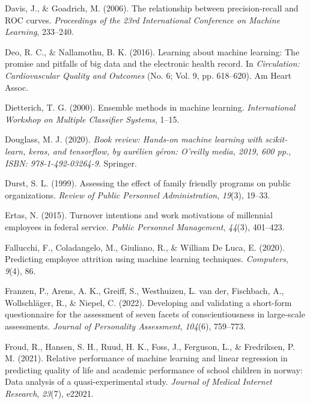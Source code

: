 \documentclass[
  man]{apa7}
\newlength{\cslhangindent}
\newlength{\cslentryspacingunit} %
\newenvironment{CSLReferences}[2] %
 {%
  \setlength{\parindent}{0pt}
  \ifodd #1
  \let\oldpar\par
  \def\par{\hangindent=\cslhangindent\oldpar}
  \fi
  \setlength{\parskip}{#2\cslentryspacingunit}
 }%
 {}
\begin{document}
\begin{CSLReferences}{1}{0}
\leavevmode{}%
Davis, J., \& Goadrich, M. (2006). The relationship between precision-recall and ROC curves. \emph{Proceedings of the 23rd International Conference on Machine Learning}, 233--240.

\leavevmode{}%
Deo, R. C., \& Nallamothu, B. K. (2016). Learning about machine learning: The promise and pitfalls of big data and the electronic health record. In \emph{Circulation: Cardiovascular Quality and Outcomes} (No. 6; Vol. 9, pp. 618--620). Am Heart Assoc.

\leavevmode{}%
Dietterich, T. G. (2000). Ensemble methods in machine learning. \emph{International Workshop on Multiple Classifier Systems}, 1--15.

\leavevmode{}%
Douglass, M. J. (2020). \emph{Book review: Hands-on machine learning with scikit-learn, keras, and tensorflow, by aur{é}lien g{é}ron: O'reilly media, 2019, 600 pp., ISBN: 978-1-492-03264-9}. Springer.

\leavevmode{}%
Durst, S. L. (1999). Assessing the effect of family friendly programs on public organizations. \emph{Review of Public Personnel Administration}, \emph{19}(3), 19--33.

\leavevmode{}%
Ertas, N. (2015). Turnover intentions and work motivations of millennial employees in federal service. \emph{Public Personnel Management}, \emph{44}(3), 401--423.

\leavevmode{}%
Fallucchi, F., Coladangelo, M., Giuliano, R., \& William De Luca, E. (2020). Predicting employee attrition using machine learning techniques. \emph{Computers}, \emph{9}(4), 86.

\leavevmode{}%
Franzen, P., Arens, A. K., Greiff, S., Westhuizen, L. van der, Fischbach, A., Wollschläger, R., \& Niepel, C. (2022). Developing and validating a short-form questionnaire for the assessment of seven facets of conscientiousness in large-scale assessments. \emph{Journal of Personality Assessment}, \emph{104}(6), 759--773.

\leavevmode{}%
Froud, R., Hansen, S. H., Ruud, H. K., Foss, J., Ferguson, L., \& Fredriksen, P. M. (2021). Relative performance of machine learning and linear regression in predicting quality of life and academic performance of school children in norway: Data analysis of a quasi-experimental study. \emph{Journal of Medical Internet Research}, \emph{23}(7), e22021.


\end{CSLReferences}
\end{document}
